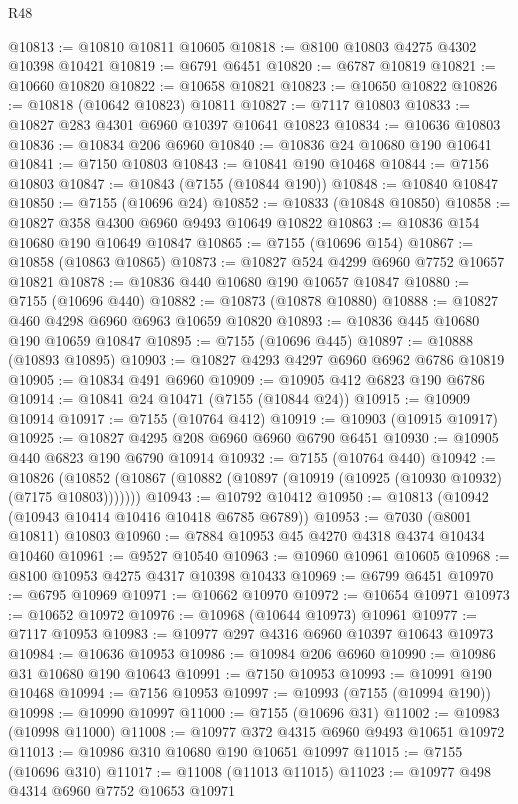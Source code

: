 \begin{lexlean}{R48}
\begin{coremodule}
@10813 := @10810 @10811 @10605
@10818 := @8100 @10803 @4275 @4302 @10398 @10421
@10819 := @6791 @6451
@10820 := @6787 @10819
@10821 := @10660 @10820
@10822 := @10658 @10821
@10823 := @10650 @10822
@10826 := @10818 (@10642 @10823) @10811
@10827 := @7117 @10803
@10833 := @10827 @283 @4301 @6960 @10397 @10641 @10823
@10834 := @10636 @10803
@10836 := @10834 @206 @6960
@10840 := @10836 @24 @10680 @190 @10641
@10841 := @7150 @10803
@10843 := @10841 @190 @10468
@10844 := @7156 @10803
@10847 := @10843 (@7155 (@10844 @190))
@10848 := @10840 @10847
@10850 := @7155 (@10696 @24)
@10852 := @10833 (@10848 @10850)
@10858 := @10827 @358 @4300 @6960 @9493 @10649 @10822
@10863 := @10836 @154 @10680 @190 @10649 @10847
@10865 := @7155 (@10696 @154)
@10867 := @10858 (@10863 @10865)
@10873 := @10827 @524 @4299 @6960 @7752 @10657 @10821
@10878 := @10836 @440 @10680 @190 @10657 @10847
@10880 := @7155 (@10696 @440)
@10882 := @10873 (@10878 @10880)
@10888 := @10827 @460 @4298 @6960 @6963 @10659 @10820
@10893 := @10836 @445 @10680 @190 @10659 @10847
@10895 := @7155 (@10696 @445)
@10897 := @10888 (@10893 @10895)
@10903 := @10827 @4293 @4297 @6960 @6962 @6786 @10819
@10905 := @10834 @491 @6960
@10909 := @10905 @412 @6823 @190 @6786
@10914 := @10841 @24 @10471 (@7155 (@10844 @24))
@10915 := @10909 @10914
@10917 := @7155 (@10764 @412)
@10919 := @10903 (@10915 @10917)
@10925 := @10827 @4295 @208 @6960 @6960 @6790 @6451
@10930 := @10905 @440 @6823 @190 @6790 @10914
@10932 := @7155 (@10764 @440)
@10942 := @10826
    (@10852 (@10867 (@10882 (@10897 (@10919 (@10925 (@10930 @10932) (@7175 @10803)))))))
@10943 := @10792 @10412
@10950 := @10813 (@10942 (@10943 @10414 @10416 @10418 @6785 @6789))
@10953 := @7030 (@8001 @10811) @10803
@10960 := @7884 @10953 @45 @4270 @4318 @4374 @10434 @10460
@10961 := @9527 @10540
@10963 := @10960 @10961 @10605
@10968 := @8100 @10953 @4275 @4317 @10398 @10433
@10969 := @6799 @6451
@10970 := @6795 @10969
@10971 := @10662 @10970
@10972 := @10654 @10971
@10973 := @10652 @10972
@10976 := @10968 (@10644 @10973) @10961
@10977 := @7117 @10953
@10983 := @10977 @297 @4316 @6960 @10397 @10643 @10973
@10984 := @10636 @10953
@10986 := @10984 @206 @6960
@10990 := @10986 @31 @10680 @190 @10643
@10991 := @7150 @10953
@10993 := @10991 @190 @10468
@10994 := @7156 @10953
@10997 := @10993 (@7155 (@10994 @190))
@10998 := @10990 @10997
@11000 := @7155 (@10696 @31)
@11002 := @10983 (@10998 @11000)
@11008 := @10977 @372 @4315 @6960 @9493 @10651 @10972
@11013 := @10986 @310 @10680 @190 @10651 @10997
@11015 := @7155 (@10696 @310)
@11017 := @11008 (@11013 @11015)
@11023 := @10977 @498 @4314 @6960 @7752 @10653 @10971

\end{coremodule}
\end{lexlean}
